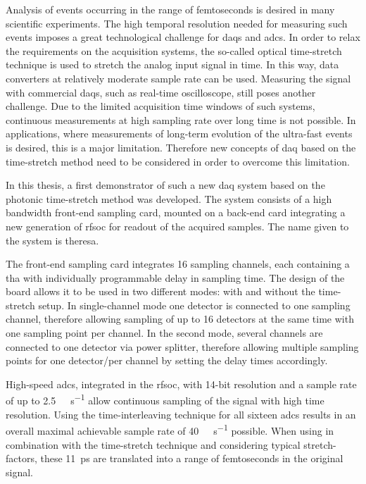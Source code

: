Analysis of events occurring in the range of femtoseconds is desired in many scientific experiments.
The high temporal resolution needed for measuring such events imposes a great technological challenge for \glspl{daq} and \glspl{adc}.
In order to relax the requirements on the acquisition systems, the so-called optical time-stretch technique is used to stretch the analog input signal in time.
In this way, data converters at relatively moderate sample rate can be used.
Measuring the signal with commercial \glspl{daq}, such as real-time oscilloscope, still poses another challenge.
Due to the limited acquisition time windows of such systems, continuous measurements at high sampling rate over long time is not possible.
In applications, where measurements of long-term evolution of the ultra-fast events is desired, this is a major limitation.
Therefore new concepts of \gls{daq} based on the time-stretch method need to be considered in order to overcome this limitation. 

In this thesis, a first demonstrator of such a new \gls{daq} system based on the photonic time-stretch method was developed.
The system consists of a high bandwidth front-end sampling card, mounted on a back-end card integrating a new generation of \gls{rfsoc} for readout of the acquired samples. The name given to the system is \gls{theresa}.

The front-end sampling card integrates 16 sampling channels, each containing a \gls{tha} with individually programmable delay in sampling time. 
The design of the board allows it to be used in two different modes: with and without the time-stretch setup.
In single-channel mode one detector is connected to one sampling channel, therefore allowing sampling of up to 16 detectors at the same time with one sampling point per channel.
In the second mode, several channels are connected to one detector via power splitter, therefore allowing multiple sampling points for one detector/per channel by setting the delay times accordingly. 

High-speed \glspl{adc}, integrated in the \gls{rfsoc}, with 14-bit resolution and a sample rate of up to \SI{2.5}{\giga \sample \per \second} allow continuous sampling of the signal with high time resolution. 
Using the time-interleaving technique for all sixteen \glspl{adc} results in an overall maximal achievable sample rate of \SI{40}{\giga \sample \per \second} possible.  
When using in combination with the time-stretch technique and considering typical stretch-factors, these \SI{11}{\pico \second} are translated into a range of femtoseconds in the original signal.

